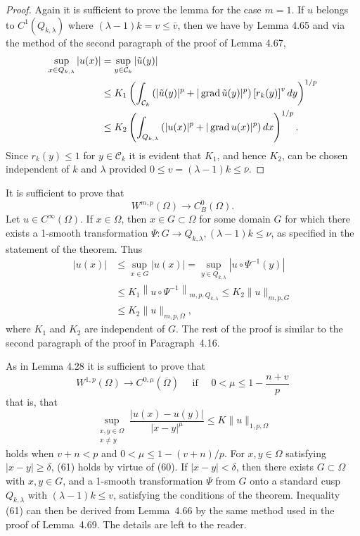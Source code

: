 \begin{proof}
  Again it is sufficient to prove the lemma for the case $m=1$.
  If $u$ belongs to $C^1\left(Q_{k, \lambda}\right)$ where $(\lambda-1) k=v \leq \bar{v}$,
  then we have by Lemma 4.65 and via the
  method of the second paragraph of the proof of Lemma 4.67,
  \[
  \begin{aligned}
  \sup _{x \in Q_{k, \lambda}}|u(x)| & =\sup _{y \in \mathcal{C}_k}|\tilde{u}(y)| \\
  & \leq K_1\left(\int_{\mathcal{C}_k}\left(|\tilde{u}(y)|^p+|\operatorname{grad} \tilde{u}(y)|^p\right)\left[r_k(y)\right]^v d y\right)^{1 / p} \\
  & \leq K_2\left(\int_{Q_{k, \lambda}}\left(|u(x)|^p+|\operatorname{grad} u(x)|^p\right) d x\right)^{1 / p} .
  \end{aligned}
  \]
  Since $r_k(y) \leq 1$ for $y \in \mathcal{C}_k$ it is evident that $K_1$, and hence $K_2$,
  can be chosen independent of $k$ and $\lambda$ provided $0 \leq v=(\lambda-1) k \leq \bar{\nu}$.
\end{proof}


\begin{para}
  It is sufficient to prove that
  \[
  W^{m,p}(\Omega) \rightarrow C_B^0(\Omega) .
  \]
  Let $u \in C^{\infty}(\Omega)$. If $x \in \Omega$, then $x \in G \subset \Omega$ for some domain $G$
  for which there exists a 1-smooth transformation $\Psi: G \rightarrow Q_{k, \lambda},(\lambda-1) k \leq \nu$, 
  as specified in the statement of the theorem. Thus
  \[
  \begin{aligned}
  |u(x)| & \leq \sup _{x \in G}|u(x)|=\sup _{y \in Q_{k, \lambda}}\left|u \circ \Psi^{-1}(y)\right| \\
  & \leq K_1\left\|u \circ \Psi^{-1}\right\|_{m, p, Q_{k, \lambda}} \leq K_2\|u\|_{m, p, G} \\
  & \leq K_2\|u\|_{m, p, \Omega},
  \end{aligned}
  \]
  where $K_1$ and $K_2$ are independent of $G$. The rest of the proof is similar
  to the second paragraph of the proof in Paragraph~4.16.
\end{para}

\begin{para}
  As in Lemma 4.28 it is sufficient to prove that
  \[
  W^{1, p}(\Omega) \rightarrow C^{0, \mu}(\overline{\Omega}) \quad \text { if } \quad 0<\mu \leq 1-\frac{n+v}{p}
  \]
  that is, that
  \[
  \sup _{\substack{x, y \in \Omega \\ x \neq y}} \frac{|u(x)-u(y)|}{|x-y|^\mu} \leq K\|u\|_{1, p, \Omega}
  \]
  holds when $v+n<p$ and $0<\mu \leq 1-(v+n) / p$. For $x, y \in \Omega$ satisfying $|x-y| \geq \delta$,
  (61) holds by virtue of (60). If $|x-y|<\delta$, then there exists $G \subset \Omega$ with $x, y \in G$,
  and a 1-smooth transformation $\Psi$ from $G$ onto a standard cusp $Q_{k, \lambda}$
  with $(\lambda-1) k \leq v$, satisfying the conditions of the theorem. Inequality (61)
  can then be derived from Lemma~4.66 by the same method used in the proof of Lemma~4.69.
  The details are left to the reader.
\end{para}